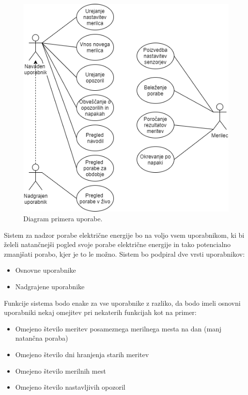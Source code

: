 \documentclass[12pt,a4paper,titlepage,openany]{report}
\begin{document}
\begin{figure}[H]
\begin{center}
\includegraphics[width=1\textwidth, height=0.9\textheight,keepaspectratio]{Slike/UseCase.png}
\end{center}
\caption{Diagram primera uporabe.}\label{slika:UseCase}
\end{figure}

\newpage
Sistem za nadzor porabe električne energije bo na voljo vsem uporabnikom, ki bi želeli natančnejši pogled svoje porabe električne energije in tako potencialno zmanjšati porabo, kjer je to le možno. Sistem bo podpiral dve vrsti uporabnikov:
\begin{itemize}
\item Osnovne uporabnike
\item Nadgrajene uporabnike
\end{itemize}
Funkcije sistema bodo enake za vse uporabnike z razliko, da bodo imeli osnovni uporabniki nekaj omejitev pri nekaterih funkcijah kot na primer:
\begin{itemize}
\item Omejeno število meritev posameznega merilnega mesta na dan (manj natančna poraba)
\item Omejeno število dni hranjenja starih meritev
\item Omejeno število merilnih mest
\item Omejeno število nastavljivih opozoril
\end{itemize}
\end{document}
